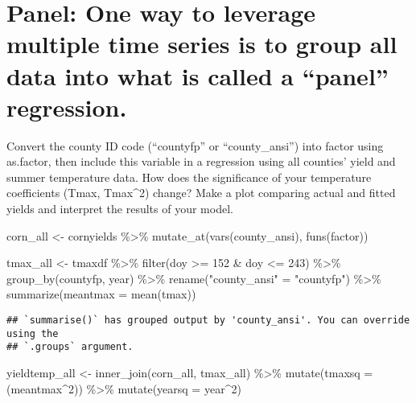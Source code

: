 \documentclass[
]{book}
\newenvironment{Shaded}{\begin{snugshade}}{\end{snugshade}}
\newcommand{\AttributeTok}[1]{\textcolor[rgb]{0.77,0.63,0.00}{#1}}
\newcommand{\DecValTok}[1]{\textcolor[rgb]{0.00,0.00,0.81}{#1}}
\newcommand{\FunctionTok}[1]{\textcolor[rgb]{0.00,0.00,0.00}{#1}}
\newcommand{\NormalTok}[1]{#1}
\newcommand{\OtherTok}[1]{\textcolor[rgb]{0.56,0.35,0.01}{#1}}
\newcommand{\SpecialCharTok}[1]{\textcolor[rgb]{0.00,0.00,0.00}{#1}}
\newcommand{\StringTok}[1]{\textcolor[rgb]{0.31,0.60,0.02}{#1}}
\begin{document}
\hypertarget{panel-one-way-to-leverage-multiple-time-series-is-to-group-all-data-into-what-is-called-a-panel-regression.}{%
\section{Panel: One way to leverage multiple time series is to group all data into what is called a ``panel'' regression.}\label{panel-one-way-to-leverage-multiple-time-series-is-to-group-all-data-into-what-is-called-a-panel-regression.}}

Convert the county ID code (``countyfp'' or ``county\_ansi'') into factor using as.factor, then include this variable in a regression using all counties' yield and summer temperature data. How does the significance of your temperature coefficients (Tmax, Tmax\^{}2) change? Make a plot comparing actual and fitted yields and interpret the results of your model.

\begin{Shaded}
\begin{Highlighting}[]
\NormalTok{corn\_all }\OtherTok{\textless{}{-}}\NormalTok{ cornyields }\SpecialCharTok{\%\textgreater{}\%}
  \FunctionTok{mutate\_at}\NormalTok{(}\FunctionTok{vars}\NormalTok{(county\_ansi), }\FunctionTok{funs}\NormalTok{(factor))}
  
\NormalTok{tmax\_all }\OtherTok{\textless{}{-}}\NormalTok{ tmaxdf }\SpecialCharTok{\%\textgreater{}\%}
  \FunctionTok{filter}\NormalTok{(doy }\SpecialCharTok{\textgreater{}=} \DecValTok{152} \SpecialCharTok{\&}\NormalTok{ doy }\SpecialCharTok{\textless{}=} \DecValTok{243}\NormalTok{) }\SpecialCharTok{\%\textgreater{}\%}
  \FunctionTok{group\_by}\NormalTok{(countyfp, year) }\SpecialCharTok{\%\textgreater{}\%}
  \FunctionTok{rename}\NormalTok{(}\StringTok{"county\_ansi"} \OtherTok{=} \StringTok{"countyfp"}\NormalTok{) }\SpecialCharTok{\%\textgreater{}\%}
  \FunctionTok{summarize}\NormalTok{(}\AttributeTok{meantmax =} \FunctionTok{mean}\NormalTok{(tmax))}
\end{Highlighting}
\end{Shaded}

\begin{verbatim}
## `summarise()` has grouped output by 'county_ansi'. You can override using the
## `.groups` argument.
\end{verbatim}

\begin{Shaded}
\begin{Highlighting}[]
\NormalTok{yieldtemp\_all }\OtherTok{\textless{}{-}} \FunctionTok{inner\_join}\NormalTok{(corn\_all, tmax\_all) }\SpecialCharTok{\%\textgreater{}\%}
  \FunctionTok{mutate}\NormalTok{(}\AttributeTok{tmaxsq =}\NormalTok{ (meantmax}\SpecialCharTok{\^{}}\DecValTok{2}\NormalTok{)) }\SpecialCharTok{\%\textgreater{}\%}
  \FunctionTok{mutate}\NormalTok{(}\AttributeTok{yearsq =}\NormalTok{ year}\SpecialCharTok{\^{}}\DecValTok{2}\NormalTok{)}
\end{Highlighting}
\end{Shaded}
\end{document}

